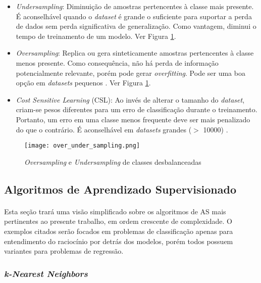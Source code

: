 \begin{itemize}
    \item \textit{Undersampling}: Diminuição de amostras pertencentes à classe mais presente. É aconselhável quando o \textit{dataset} é grande o suficiente para suportar a perda de dados sem perda significativa de generalização. Como vantagem, diminui o tempo de treinamento de um modelo. Ver Figura \ref{fig:7}.
    \item \textit{Oversampling}: Replica ou gera sinteticamente amostras pertencentes à classe menos presente. Como consequência, não há perda de informação potencialmente relevante, porém pode gerar \textit{overfitting}. Pode ser uma boa opção em \textit{datasets} pequenos \cite{weiss2007cost}. Ver Figura \ref{fig:7}.
    \item \textit{Cost Sensitive Learning} (CSL): Ao invés de alterar o tamanho do \textit{dataset}, criam-se pesos diferentes para um erro de classificação durante o treinamento. Portanto, um erro em uma classe menos frequente deve ser mais penalizado do que o contrário. É aconselhável em \textit{datasets} grandes ($>$ 10000) \cite{weiss2007cost}.
\end{itemize}

\begin{figure}[!htb]
    \texttt{[image: over\_under\_sampling.png]}
    \centering
    \caption{\textit{Oversampling} e \textit{Undersampling} de classes desbalanceadas \cite{over_under_sampling}}
    \label{fig:7}
\end{figure}



\FloatBarrier
\subsection{Algoritmos de Aprendizado Supervisionado}
\label{sub:alg_apren_sup}

\paragraph{} Esta seção trará uma visão simplificado sobre os algoritmos de AS mais pertinentes ao presente trabalho, em ordem crescente de complexidade. O exemplos citados serão focados em problemas de classificação apenas para entendimento do raciocínio por detrás dos modelos, porém todos possuem variantes para problemas de regressão.


\FloatBarrier
\subsubsection*{\textit{k-Nearest Neighbors}}

